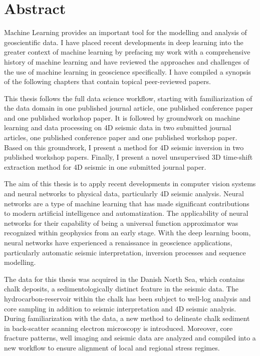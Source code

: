 \chapter{Abstract}
Machine Learning provides an important tool for the modelling and analysis of geoscientific data. I have placed recent developments in deep learning into the greater context of machine learning by prefacing my work with a comprehensive history of machine learning and have reviewed the approaches and challenges of the use of machine learning in geoscience specifically. I have compiled a synopsis of the following chapters that contain topical peer-reviewed papers. 

This thesis follows the full data science workflow, starting with familiarization of the data domain in one published journal article, one published conference paper and one published workshop paper. It is followed by groundwork on machine learning and data processing on 4D seismic data in two submitted journal articles, one published conference paper and one published workshop paper. Based on this groundwork, I present a method for 4D seismic inversion in two published workshop papers. Finally, I present a novel unsupervised 3D time-shift extraction method for 4D seismic in one submitted journal paper. 

The aim of this thesis is to apply recent developments in computer vision systems and neural networks to physical data, particularly 4D seismic analysis. Neural networks are a type of machine learning that has made significant contributions to modern artificial intelligence and automatization. The applicability of neural networks for their capability of being a universal function approximator was recognized within geophysics from an early stage. With the deep learning boom, neural networks have experienced a renaissance in geoscience applications, particularly automatic seismic interpretation, inversion processes and sequence modelling.

The data for this thesis was acquired in the Danish North Sea, which contains chalk deposits, a sedimentologically distinct feature in the seismic data. The hydrocarbon-reservoir within the chalk has been subject to well-log analysis and core sampling in addition to seismic interpretation and 4D seismic analysis. During familiarization with the data, a new method to delineate chalk sediment in back-scatter scanning electron microscopy is introduced. Moreover, core fracture patterns, well imaging and seismic data are analyzed and compiled into a new workflow to ensure alignment of local and regional stress regimes.

